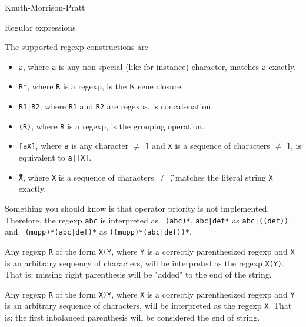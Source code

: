 
\begin{algorithm}{Knuth-Morrison-Pratt}
\end{algorithm}

\begin{algorithm}{Regular expressions}


The supported regexp constructions are
\begin{itemize}
 \item{{\tt a}}, where {\tt a} is any non-special (like {\tt *} for instance) character, matches {\tt a} exactly.
 \item{{\tt R*}}, where {\tt R} is a regexp, is the Kleene closure.
 \item{{\tt R1|R2}}, where {\tt R1} and {\tt R2} are regexps, is concatenation.
 \item{{\tt (R)}}, where {\tt R} is a regexp, is the grouping operation.
 \item{{\tt [aX]}}, where {\tt a} is any character $\neq$ {\tt ]} and {\tt X} is a sequence of characters $\neq$ {\tt ]}, is equivalent to {\tt a|[X]}.
 \item{{\tt \"{}X\"{}}}, where {\tt X} is a sequence of characters $\neq$ {\tt \"{}}, matches the literal string {\tt X} exactly.
\end{itemize}

Something you should know is that operator priority is not
implemented. Therefore, the regexp {\tt abc\*} is interpreted as {\tt
(abc)*}, {\tt abc|def*} as {\tt abc|((def)\*)}, and {\tt
(mupp)*(abc|def)*} as {\tt ((mupp)*(abc|def))*}.

Any regexp {\tt R} of the form {\tt X(Y}, where {\tt Y} is a correctly
parenthesized regexp and {\tt X} is an arbitrary sequency of characters,
will be interpreted as the regexp {\tt X(Y)}. That is: missing right
parenthesis will be "added" to the end of the string.

Any regexp {\tt R} of the form {\tt X)Y}, where {\tt X} is a correctly
parenthesized regexp and {\tt Y} is an arbitrary sequence of
characters, will be interpreted as the regexp {\tt X}. That is: the
first inbalanced parenthesis will be considered the end of string.

\end{algorithm}